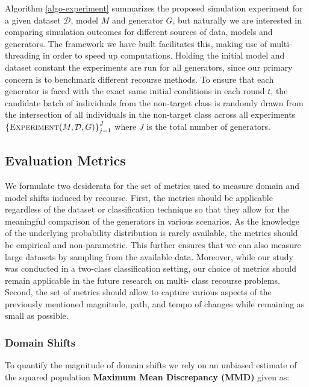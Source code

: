 \documentclass[conference,final,]{IEEEtran}
\theoremstyle{definition}
\theoremstyle{definition}
\theoremstyle{definition}
\theoremstyle{definition}
\theoremstyle{remark}
\begin{document}
Algorithm \ref{algo-experiment} summarizes the proposed simulation experiment for a given dataset \(\mathcal{D}\), model \(M\) and generator \(G\), but naturally we are interested in comparing simulation outcomes for different sources of data, models and generators. The framework we have built facilitates this, making use of multi-threading in order to speed up computations. Holding the initial model and dataset constant the experiments are run for all generators, since our primary concern is to benchmark different recourse methods. To ensure that each generator is faced with the exact same initial conditions in each round \(t\), the candidate batch of individuals from the non-target class is randomly drawn from the intersection of all individuals in the non-target class across all experiments \(\left\{\textsc{Experiment}(M,\mathcal{D},G)\right\}_{j=1}^J\) where \(J\) is the total number of generators.

\hypertarget{method-2-metrics}{%
\subsection{Evaluation Metrics}\label{method-2-metrics}}

We formulate two desiderata for the set of metrics used to measure domain and model shifts induced by recourse. First, the metrics should be applicable regardless of the dataset or classification technique so that they allow for the meaningful comparison of the generators in various scenarios. As the knowledge of the underlying probability distribution is rarely available, the metrics should be empirical and non-parametric. This further ensures that we can also measure large datasets by sampling from the available data. Moreover, while our study was conducted in a two-class classification setting, our choice of metrics should remain applicable in the future research on multi- class recourse problems. Second, the set of metrics should allow to capture various aspects of the previously mentioned magnitude, path, and tempo of changes while remaining as small as possible.

\hypertarget{domain-shifts}{%
\subsubsection{Domain Shifts}\label{domain-shifts}}

To quantify the magnitude of domain shifts we rely on an unbiased estimate of the squared population \textbf{Maximum Mean Discrepancy (MMD)} given as:
\end{document}
